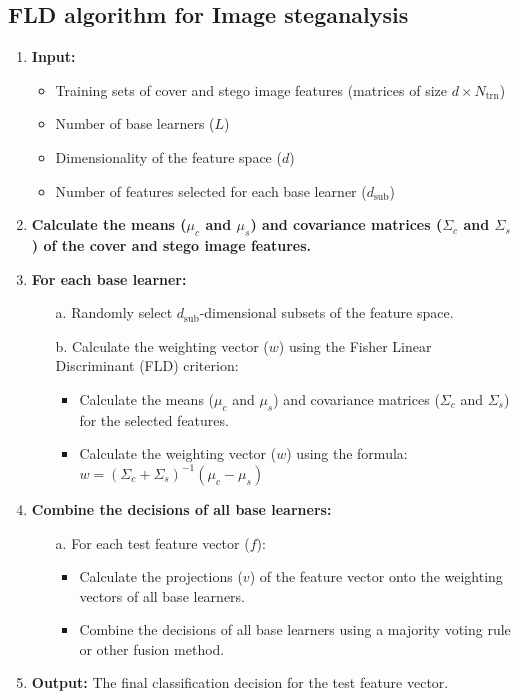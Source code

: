 \subsection{FLD algorithm for Image steganalysis} 
\begin{enumerate}[noitemsep]
    \item \textbf{Input:}
    \begin{itemize}
        \item Training sets of cover and stego image features (matrices of size \(d \times N_{\text{trn}}\))
        \item Number of base learners (\(L\))
        \item Dimensionality of the feature space (\(d\))
        \item Number of features selected for each base learner (\(d_{\text{sub}}\))
    \end{itemize}
    
    \item \textbf{Calculate the means (\( \mu_c \) and \( \mu_s \)) and covariance matrices (\( \Sigma_c \) and \( \Sigma_s \)) of the cover and stego image features.}
    
    \item \textbf{For each base learner:}
    \begin{itemize}
        \item[a.] Randomly select \(d_{\text{sub}}\)-dimensional subsets of the feature space.
        \item[b.] Calculate the weighting vector (\(w\)) using the Fisher Linear Discriminant (FLD) criterion:
        \begin{itemize}
            \item Calculate the means (\( \mu_c \) and \( \mu_s \)) and covariance matrices (\( \Sigma_c \) and \( \Sigma_s \)) for the selected features.
            \item Calculate the weighting vector (\(w\)) using the formula: \(w = (\Sigma_c + \Sigma_s)^{-1} (\mu_c - \mu_s)\)
        \end{itemize}
    \end{itemize}
    
    \item \textbf{Combine the decisions of all base learners:}
    \begin{itemize}
        \item[a.] For each test feature vector (\(f\)):
        \begin{itemize}
            \item Calculate the projections (\(v\)) of the feature vector onto the weighting vectors of all base learners.
            \item Combine the decisions of all base learners using a majority voting rule or other fusion method.
        \end{itemize}
    \end{itemize}
    
    \item \textbf{Output:} The final classification decision for the test feature vector.
\end{enumerate}

